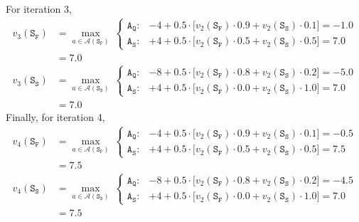 \documentclass[11pt]{article}
\begin{document}
    For iteration 3,
    \begin{align*}
        v_{3}(\texttt{S}_{\texttt{F}}) &= \max_{a \in \mathcal{A}(\texttt{S}_{\texttt{F}})} \
        \begin{cases}
            \texttt{A}_{\texttt{Q}}: & -4 + 0.5 \cdot \big[ v_{2}(\texttt{S}_{\texttt{F}}) \cdot 0.9 + v_{2}(\texttt{S}_{\texttt{S}}) \cdot 0.1 \big] = -1.0 \\
            \texttt{A}_{\texttt{S}}: & +4 + 0.5 \cdot \big[ v_{2}(\texttt{S}_{\texttt{F}}) \cdot 0.5 + v_{2}(\texttt{S}_{\texttt{S}}) \cdot 0.5 \big] = 7.0
        \end{cases} \\
        &= 7.0 \\
        v_{3}(\texttt{S}_{\texttt{S}}) &= \max_{a \in \mathcal{A}(\texttt{S}_{\texttt{S}})} \
        \begin{cases}
            \texttt{A}_{\texttt{Q}}: & -8 + 0.5 \cdot \big[ v_{2}(\texttt{S}_{\texttt{F}}) \cdot 0.8 + v_{2}(\texttt{S}_{\texttt{S}}) \cdot 0.2 \big] = -5.0 \\
            \texttt{A}_{\texttt{S}}: & +4 + 0.5 \cdot \big[ v_{2}(\texttt{S}_{\texttt{F}}) \cdot 0.0 + v_{2}(\texttt{S}_{\texttt{S}}) \cdot 1.0 \big] = 7.0
        \end{cases} \\
        &= 7.0
    \end{align*}
    Finally, for iteration 4,
    \begin{align*}
        v_{4}(\texttt{S}_{\texttt{F}}) &= \max_{a \in \mathcal{A}(\texttt{S}_{\texttt{F}})} \
        \begin{cases}
            \texttt{A}_{\texttt{Q}}: & -4 + 0.5 \cdot \big[ v_{2}(\texttt{S}_{\texttt{F}}) \cdot 0.9 + v_{2}(\texttt{S}_{\texttt{S}}) \cdot 0.1 \big] = -0.5 \\
            \texttt{A}_{\texttt{S}}: & +4 + 0.5 \cdot \big[ v_{2}(\texttt{S}_{\texttt{F}}) \cdot 0.5 + v_{2}(\texttt{S}_{\texttt{S}}) \cdot 0.5 \big] = 7.5
        \end{cases} \\
        &= 7.5 \\
        v_{4}(\texttt{S}_{\texttt{S}}) &= \max_{a \in \mathcal{A}(\texttt{S}_{\texttt{S}})} \
        \begin{cases}
            \texttt{A}_{\texttt{Q}}: & -8 + 0.5 \cdot \big[ v_{2}(\texttt{S}_{\texttt{F}}) \cdot 0.8 + v_{2}(\texttt{S}_{\texttt{S}}) \cdot 0.2 \big] = -4.5 \\
            \texttt{A}_{\texttt{S}}: & +4 + 0.5 \cdot \big[ v_{2}(\texttt{S}_{\texttt{F}}) \cdot 0.0 + v_{2}(\texttt{S}_{\texttt{S}}) \cdot 1.0 \big] = 7.0
        \end{cases} \\
        &= 7.5
    \end{align*}
\end{document}
